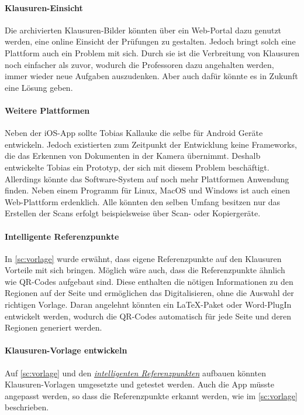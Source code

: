 \documentclass[notables, nomenclature, oneside, 150]{HSMW-Thesis}
\begin{document}
	\paragraph*{Klausuren-Einsicht} 
		Die archivierten Klausuren-Bilder könnten über ein Web-Portal dazu genutzt werden, eine online Einsicht der Prüfungen zu gestalten. Jedoch bringt solch eine Plattform auch ein Problem mit sich. Durch sie ist die Verbreitung von Klausuren noch einfacher als zuvor, wodurch die Professoren dazu angehalten werden, immer wieder neue Aufgaben auszudenken. Aber auch dafür könnte es in Zukunft eine Lösung geben. 
	
	\paragraph*{Weitere Plattformen} 
		Neben der iOS-App sollte Tobias Kallauke die selbe für Android Geräte entwickeln. Jedoch existierten zum Zeitpunkt der Entwicklung keine Frameworks, die das Erkennen von Dokumenten in der Kamera übernimmt. Deshalb entwickelte Tobias ein Prototyp, der sich mit diesem Problem beschäftigt. Allerdings könnte das Software-System auf noch mehr Plattformen Anwendung finden. Neben einem Programm für Linux, MacOS und Windows ist auch einen Web-Plattform  erdenklich. Alle könnten den selben Umfang besitzen nur das Erstellen der Scans erfolgt beispielsweise über Scan- oder Kopiergeräte.
	
	\paragraph*{Intelligente Referenzpunkte}\label{pa:referenzpunkte}
		In \autoref{sc:vorlage} wurde erwähnt, dass eigene Referenzpunkte auf den Klausuren Vorteile mit sich bringen. Möglich wäre auch, dass die Referenzpunkte ähnlich wie QR-Codes aufgebaut sind. Diese enthalten die nötigen Informationen zu den Regionen auf der Seite und ermöglichen das Digitalisieren, ohne die Auswahl der richtigen Vorlage. Daran angelehnt könnten ein \LaTeX -Paket oder Word-PlugIn entwickelt werden, wodurch die QR-Codes automatisch für jede Seite und deren Regionen generiert werden. 
	
	\paragraph*{Klausuren-Vorlage entwickeln}
		Auf \autoref{sc:vorlage} und den \hyperref[pa:referenzpunkte]{\textit{intelligenten Referenzpunkten}} aufbauen könnten Klausuren-Vorlagen umgesetzte und getestet werden. Auch die App müsste angepasst werden, so dass die Referenzpunkte erkannt werden, wie im \autoref{sc:vorlage} beschrieben.
		
\end{document}
